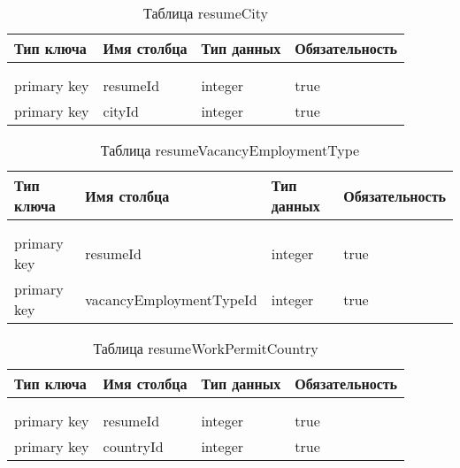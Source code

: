 \begin{xltabular}{\textwidth}{|l|l|p{1.7cm}|X|}
	\caption{Таблица resumeCity \label{resumeCity:table}}\\ \hline
	\centrow Тип ключа & \centrow Имя столбца & \centrow Тип данных & \centrow Обязательность \\ \hline
	 &  &  &  \\ \hline
	\endfirsthead
	 &  &  &  \\ \hline
	\finishhead
	primary key & resumeId & integer & true \\ \hline 
	primary key & cityId & integer & true \\ \hline
\end{xltabular}

\begin{xltabular}{\textwidth}{|l|l|p{1.7cm}|X|}
	\caption{Таблица resumeVacancyEmploymentType \label{resumeVacancyEmploymentType:table}}\\ \hline
	\centrow Тип ключа & \centrow Имя столбца & \centrow Тип данных & \centrow Обязательность \\ \hline
	 &  &  &  \\ \hline
	\endfirsthead
	 &  &  &  \\ \hline
	\finishhead
	primary key & resumeId & integer & true \\ \hline 
	primary key & vacancyEmploymentTypeId & integer & true \\ \hline
\end{xltabular}

\begin{xltabular}{\textwidth}{|l|l|p{1.7cm}|X|}
	\caption{Таблица resumeWorkPermitCountry \label{resumeWorkPermitCountry:table}}\\ \hline
	\centrow Тип ключа & \centrow Имя столбца & \centrow Тип данных & \centrow Обязательность \\ \hline
	 &  &  &  \\ \hline
	\endfirsthead
	 &  &  &  \\ \hline
	\finishhead
	primary key & resumeId & integer & true \\ \hline 
	primary key & countryId & integer & true \\ \hline
\end{xltabular}

